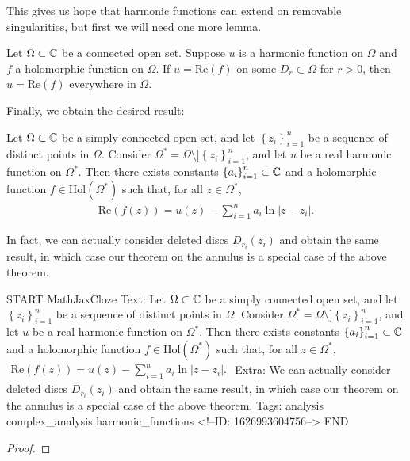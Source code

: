 \documentclass{memoir}
\begin{document}
This gives us hope that harmonic functions can extend on removable singularities, but first we will need one more lemma.

\begin{lemma}
	Let \(\Omega \subset \mathbb{C}\) be a connected open set. Suppose \(u\) is a harmonic function on \(\Omega \) and \(f\) a holomorphic function on \(\Omega \). If \(u = \textrm{Re}(f)\) on some \(D_r\subset \Omega \) for \(r>0\), then \(u = \textrm{Re}(f)\) everywhere in \(\Omega \).
\end{lemma}

Finally, we obtain the desired result:
\begin{thm}
	Let \(\Omega\subset \mathbb{C} \) be a simply connected open set, and let \(\left\{ z_i \right\}_{i=1}^{n}\) be a sequence of distinct points in \(\Omega \). Consider \(\Omega^{*}= \Omega \setminus] \left\{ z_i \right\}_{i=1}^{n}\), and let \(u\) be a real harmonic function on \(\Omega ^{*}\). Then there exists constants \(\left\{ a_i \right\}_{i=1}^{n}\subset \mathbb{C}\) and a holomorphic function \(f \in \textrm{Hol}(\Omega^{*})\) such that, for all \(z \in \Omega^{*}\),
	\begin{align*}
		\textrm{Re}(f(z)) = u(z) - \sum_{i=1}^{n} a_i \ln \left| z-z_i \right| .
	\end{align*}
\end{thm}
In fact, we can actually consider deleted discs \(D_{r_i}(z_i)\) and obtain the same result, in which case our theorem on the annulus is a special case of the above theorem.

\begin{anki}
START
MathJaxCloze
Text: Let \(\Omega\subset \mathbb{C} \) be a simply connected open set, and let \(\left\{ z_i \right\}_{i=1}^{n}\) be a sequence of distinct points in \(\Omega \). Consider \(\Omega^{*}= \Omega \setminus] \left\{ z_i \right\}_{i=1}^{n}\), and let \(u\) be a real harmonic function on \(\Omega ^{*}\). Then there exists constants \(\left\{ a_i \right\}_{i=1}^{n}\subset \mathbb{C}\) and a holomorphic function \(f \in \textrm{Hol}(\Omega^{*})\) such that, for all \(z \in \Omega^{*}\),
\(\begin{align*}
  	\textrm{Re}(f(z)) = u(z) - \sum_{i=1}^{n} a_i \ln \left| z-z_i \right| .
  \end{align*}\)
Extra: We can actually consider deleted discs \(D_{r_i}(z_i)\) and obtain the same result, in which case our theorem on the annulus is a special case of the above theorem.
Tags: analysis complex_analysis harmonic_functions
<!--ID: 1626993604756-->
END
\end{anki}


\begin{proof}
	
\end{proof}





\end{document}
